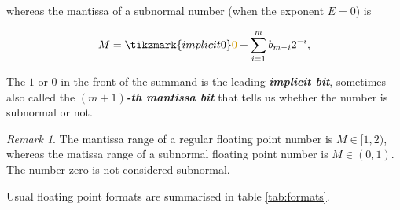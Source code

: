 \documentclass{article}
\theoremstyle{plain} %
\theoremstyle{remark} %
\newtheorem*{remark}{Remark} %
\def\df#1{\textbf{\textit{#1}}}
\numberwithin{equation}{section}
\begin{document}

whereas the mantissa of a subnormal number (when the exponent $E=0$) is

\begin{align*}
    M = \tikzmark{implicit0}\textcolor{cyellow}{0} + \sum_{i=1}^{m} b_{m-i} 2^{-i},
\end{align*}


The $1$ or $0$ in the front of the summand is the leading \df{\textcolor{cyellow}{implicit bit}}, sometimes also called the \df{$(m+1)$-th mantissa bit} that tells us whether the number is subnormal or not.

\begin{remark}
    The mantissa range of a regular floating point number is $M \in [1, 2)$, whereas the matissa range of a subnormal floating point number is $M \in (0, 1)$. The number zero is not considered subnormal.
\end{remark}

Usual floating point formats are summarised in table \ref{tab:formats}.
\end{document}
